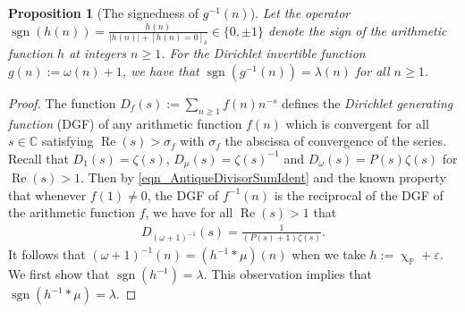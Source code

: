\documentclass[11pt,reqno,a4letter]{article}
\numberwithin{figure}{section}
\numberwithin{table}{section}
\newcommand{\Iverson}[1]{\ensuremath{\left[#1\right]_{\delta}}}
\renewcommand{\chi}{\upchi}
\theoremstyle{plain}
\newtheorem{prop}[theorem]{Proposition}
\numberwithin{theorem}{section}
\theoremstyle{definition}
\renewcommand{\Re}{\operatorname{Re}}
\begin{document}
\begin{prop}[The signedness of $g^{-1}(n)$]
\label{prop_SignageDirInvsOfPosBddArithmeticFuncs_v1} 
Let the operator 
$\operatorname{sgn}(h(n)) = \frac{h(n)}{|h(n)| + \Iverson{h(n) = 0}} \in \{0, \pm 1\}$ denote the sign 
of the arithmetic function $h$ at integers $n \geq 1$. 
For the Dirichlet invertible function $g(n) := \omega(n) + 1$, 
we have that $\operatorname{sgn}(g^{-1}(n)) = \lambda(n)$ for all $n \geq 1$. 
\end{prop} 
\begin{proof} 
The function $D_f(s) := \sum_{n \geq 1} f(n) n^{-s}$ defines the 
\emph{Dirichlet generating function} (DGF) of any 
arithmetic function $f(n)$ which is convergent for all $s \in \mathbb{C}$ satisfying 
$\Re(s) > \sigma_f$ with $\sigma_f$ the abscissa of convergence of the series. 
Recall that $D_1(s) = \zeta(s)$, $D_{\mu}(s) = \zeta(s)^{-1}$ and $D_{\omega}(s) = P(s) \zeta(s)$ for 
$\Re(s) > 1$. 
Then by \eqref{eqn_AntiqueDivisorSumIdent} and the known property that whenever $f(1) \neq 0$, 
the DGF of $f^{-1}(n)$ is 
the reciprocal of the DGF of the arithmetic function $f$, 
we have for all $\Re(s) > 1$ that 
\begin{align} 
\label{eqn_DGF_of_gInvn} 
D_{(\omega+1)^{-1}}(s) = \frac{1}{(P(s)+1) \zeta(s)}. 
\end{align} 
It follows that $(\omega + 1)^{-1}(n) = (h^{-1} \ast \mu)(n)$ when we take 
$h := \chi_{\mathbb{P}} + \varepsilon$. 
We first show that $\operatorname{sgn}(h^{-1}) = \lambda$. 
This observation implies 
that $\operatorname{sgn}(h^{-1} \ast \mu) = \lambda$. 


\end{proof}
\end{document}
